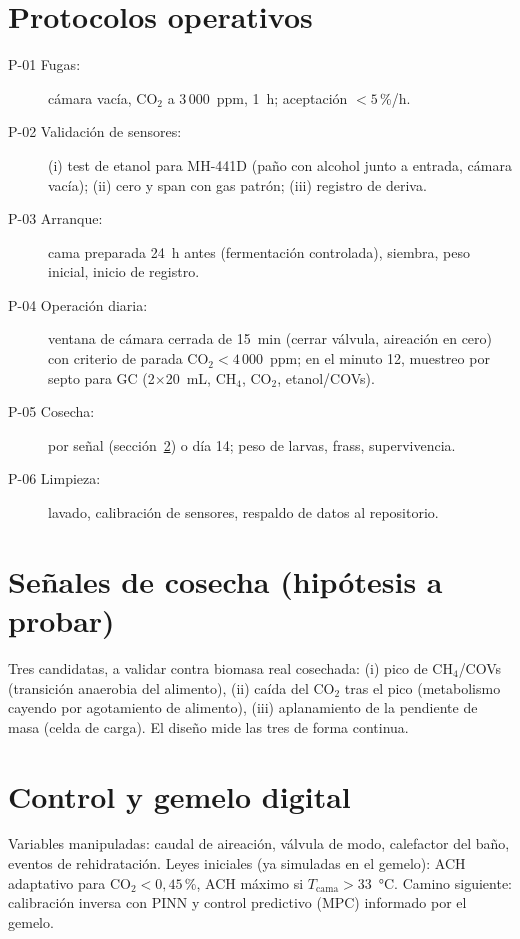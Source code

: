 \documentclass[11pt,a4paper]{article}
\begin{document}
\section{Protocolos operativos}

\begin{description}
  \item[P-01 Fugas:] cámara vacía, CO$_2$ a 3\,000~ppm, 1~h;
        aceptación $<5$\,\%/h.
  \item[P-02 Validación de sensores:] (i) test de etanol para
        MH-441D (paño con alcohol junto a entrada, cámara vacía);
        (ii) cero y span con gas patrón; (iii) registro de deriva.
  \item[P-03 Arranque:] cama preparada 24~h antes (fermentación
        controlada), siembra, peso inicial, inicio de registro.
  \item[P-04 Operación diaria:] ventana de cámara cerrada de
        15~min (cerrar válvula, aireación en cero) con criterio de
        parada CO$_2<4\,000$~ppm; en el minuto 12, muestreo por
        septo para GC (2$\times$20~mL, CH$_4$, CO$_2$, etanol/COVs).
  \item[P-05 Cosecha:] por señal (sección~\ref{sec:cosecha}) o día
        14; peso de larvas, frass, supervivencia.
  \item[P-06 Limpieza:] lavado, calibración de sensores, respaldo
        de datos al repositorio.
\end{description}

\section{Señales de cosecha (hipótesis a probar)}
\label{sec:cosecha}

Tres candidatas, a validar contra biomasa real cosechada:
(i) pico de CH$_4$/COVs (transición anaerobia del alimento),
(ii) caída del CO$_2$ tras el pico (metabolismo cayendo por
agotamiento de alimento), (iii) aplanamiento de la pendiente de masa
(celda de carga). El diseño mide las tres de forma continua.

\section{Control y gemelo digital}

Variables manipuladas: caudal de aireación, válvula de modo,
calefactor del baño, eventos de rehidratación.
Leyes iniciales (ya simuladas en el gemelo): ACH adaptativo para
CO$_2<0{,}45$\,\%, ACH máximo si $T_\text{cama}>33$~°C.
Camino siguiente: calibración inversa con PINN y control predictivo
(MPC) informado por el gemelo.
\end{document}
